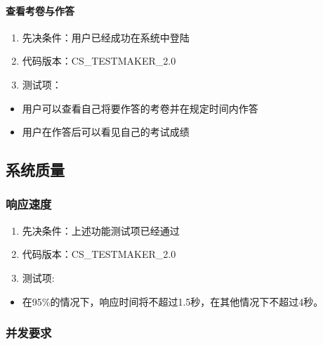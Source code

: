\documentclass[hyperref, a4paper]{ctexart}
\providecommand{\tightlist}{%
  \setlength{\itemsep}{0pt}\setlength{\parskip}{0pt}}
\let\oldparagraph\paragraph
\renewcommand{\paragraph}[1]{\oldparagraph{#1}\mbox{}}
\begin{document}
\hypertarget{ux67e5ux770bux8003ux5377ux4e0eux4f5cux7b54}{%
\paragraph{查看考卷与作答}\label{ux67e5ux770bux8003ux5377ux4e0eux4f5cux7b54}}

\begin{enumerate}
\def\labelenumi{\arabic{enumi}.}
\tightlist
\item
  先决条件：用户已经成功在系统中登陆
\item
  代码版本：CS\_TESTMAKER\_2.0
\item
  测试项：
\end{enumerate}

\begin{itemize}
\tightlist
\item
  用户可以查看自己将要作答的考卷并在规定时间内作答
\item
  用户在作答后可以看见自己的考试成绩
\end{itemize}

\hypertarget{ux7cfbux7edfux8d28ux91cf}{%
\subsection{系统质量}\label{ux7cfbux7edfux8d28ux91cf}}

\hypertarget{ux54cdux5e94ux901fux5ea6}{%
\subsubsection{响应速度}\label{ux54cdux5e94ux901fux5ea6}}

\begin{enumerate}
\def\labelenumi{\arabic{enumi}.}
\tightlist
\item
  先决条件：上述功能测试项已经通过
\item
  代码版本：CS\_TESTMAKER\_2.0
\item
  测试项:
\end{enumerate}

\begin{itemize}
\tightlist
\item
  在95\%的情况下，响应时间将不超过1.5秒，在其他情况下不超过4秒。
\end{itemize}

\hypertarget{ux5e76ux53d1ux8981ux6c42}{%
\subsubsection{并发要求}\label{ux5e76ux53d1ux8981ux6c42}}
\end{document}
